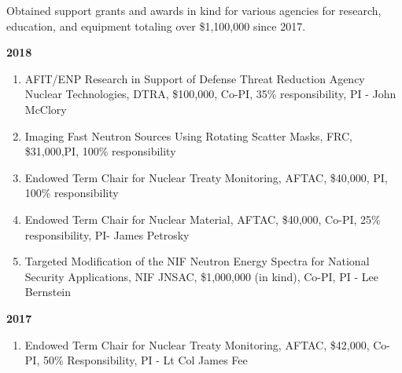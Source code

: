 Obtained support grants and awards in kind for various agencies for research, education, and equipment totaling over \$1,100,000 since 2017.

\textbf{2018}
\begin{enumerate}
  \item AFIT/ENP Research in Support of Defense Threat Reduction Agency Nuclear Technologies, DTRA, \$100,000, Co-PI, 35\% responsibility, PI - John McClory
  \item Imaging Fast Neutron Sources Using Rotating Scatter Masks, FRC, \$31,000,PI, 100\% responsibility
  \item Endowed Term Chair for Nuclear Treaty Monitoring, AFTAC, \$40,000, PI, 100\% responsibility 
  \item Endowed Term Chair for Nuclear Material, AFTAC, \$40,000, Co-PI, 25\% responsibility, PI- James Petrosky
  \item Targeted Modification of the NIF Neutron Energy Spectra for National Security Applications, NIF JNSAC, \$1,000,000 (in kind), Co-PI, PI - Lee Bernstein
\end{enumerate}

\textbf{2017}
\begin{enumerate}
  \item Endowed Term Chair for Nuclear Treaty Monitoring, AFTAC, \$42,000, Co-PI, 50\% Responsibility, PI - Lt Col James Fee  
\end{enumerate}